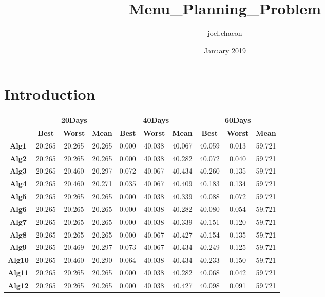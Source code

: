 \documentclass{article}
\title{Menu_Planning_Problem}
\author{joel.chacon }
\date{January 2019}
\begin{document}
\maketitle

\section{Introduction}
\begin{table}[]
\begin{tabular}{c|c|c|c|c|c|c|c|c|c|}
\cline{2-10}
 & \multicolumn{3}{c|}{\textbf{20Days}} & \multicolumn{3}{c|}{\textbf{40Days}} & \multicolumn{3}{c|}{\textbf{60Days}} \\ \cline{2-10} 
 & \textbf{Best} & \textbf{Worst} & \textbf{Mean} &\textbf{Best} & \textbf{Worst} & \textbf{Mean} & \textbf{Best} & \textbf{Worst} & \textbf{Mean} \\ \hline
\multicolumn{1}{|c|}{\textbf{Alg1}} & 20.265 & 20.265 & 20.265 & 0.000 & 40.038 & 40.067 & 40.059 & 0.013 & 59.721 \\ \hline
\multicolumn{1}{|c|}{\textbf{Alg2}} & 20.265 & 20.265 & 20.265 & 0.000 & 40.038 & 40.282 & 40.072 & 0.040 & 59.721 \\ \hline
\multicolumn{1}{|c|}{\textbf{Alg3}} & 20.265 & 20.460 & 20.297 & 0.072 & 40.067 & 40.434 & 40.260 & 0.135 & 59.721 \\ \hline
\multicolumn{1}{|c|}{\textbf{Alg4}} & 20.265 & 20.460 & 20.271 & 0.035 & 40.067 & 40.409 & 40.183 & 0.134 & 59.721 \\ \hline
\multicolumn{1}{|c|}{\textbf{Alg5}} & 20.265 & 20.265 & 20.265 & 0.000 & 40.038 & 40.339 & 40.088 & 0.072 & 59.721 \\ \hline
\multicolumn{1}{|c|}{\textbf{Alg6}} & 20.265 & 20.265 & 20.265 & 0.000 & 40.038 & 40.282 & 40.080 & 0.054 & 59.721 \\ \hline
\multicolumn{1}{|c|}{\textbf{Alg7}} & 20.265 & 20.265 & 20.265 & 0.000 & 40.038 & 40.339 & 40.151 & 0.120 & 59.721 \\ \hline
\multicolumn{1}{|c|}{\textbf{Alg8}} & 20.265 & 20.265 & 20.265 & 0.000 & 40.067 & 40.427 & 40.154 & 0.135 & 59.721 \\ \hline
\multicolumn{1}{|c|}{\textbf{Alg9}} & 20.265 & 20.469 & 20.297 & 0.073 & 40.067 & 40.434 & 40.249 & 0.125 & 59.721 \\ \hline
\multicolumn{1}{|c|}{\textbf{Alg10}} & 20.265 & 20.460 & 20.290 & 0.064 & 40.038 & 40.434 & 40.233 & 0.150 & 59.721 \\ \hline
\multicolumn{1}{|c|}{\textbf{Alg11}} & 20.265 & 20.265 & 20.265 & 0.000 & 40.038 & 40.282 & 40.068 & 0.042 & 59.721 \\ \hline
\multicolumn{1}{|c|}{\textbf{Alg12}} & 20.265 & 20.265 & 20.265 & 0.000 & 40.038 & 40.427 & 40.098 & 0.091 & 59.721 \\ \hline
\end{tabular}
\end{table}
\end{document}
